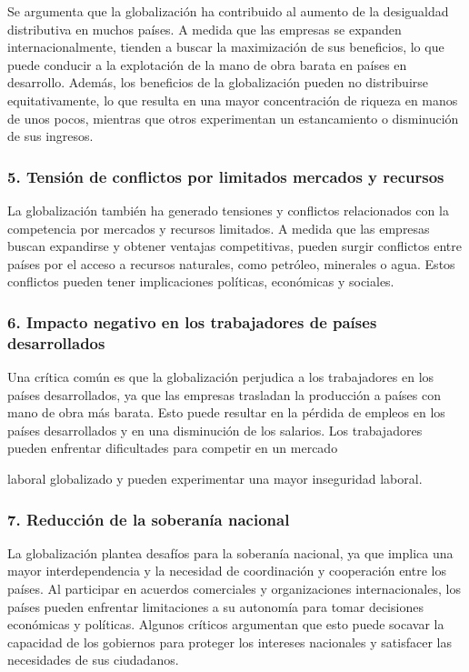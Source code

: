 \documentclass[
  a4paper,
]{article}
\begin{document}
Se argumenta que la globalización ha contribuido al aumento de la
desigualdad distributiva en muchos países. A medida que las empresas se
expanden internacionalmente, tienden a buscar la maximización de sus
beneficios, lo que puede conducir a la explotación de la mano de obra
barata en países en desarrollo. Además, los beneficios de la
globalización pueden no distribuirse equitativamente, lo que resulta en
una mayor concentración de riqueza en manos de unos pocos, mientras que
otros experimentan un estancamiento o disminución de sus ingresos.

\subsubsection{5. Tensión de conflictos por limitados mercados y
recursos}\label{tensiuxf3n-de-conflictos-por-limitados-mercados-y-recursos}

La globalización también ha generado tensiones y conflictos relacionados
con la competencia por mercados y recursos limitados. A medida que las
empresas buscan expandirse y obtener ventajas competitivas, pueden
surgir conflictos entre países por el acceso a recursos naturales, como
petróleo, minerales o agua. Estos conflictos pueden tener implicaciones
políticas, económicas y sociales.

\subsubsection{6. Impacto negativo en los trabajadores de países
desarrollados}\label{impacto-negativo-en-los-trabajadores-de-pauxedses-desarrollados}

Una crítica común es que la globalización perjudica a los trabajadores
en los países desarrollados, ya que las empresas trasladan la producción
a países con mano de obra más barata. Esto puede resultar en la pérdida
de empleos en los países desarrollados y en una disminución de los
salarios. Los trabajadores pueden enfrentar dificultades para competir
en un mercado

laboral globalizado y pueden experimentar una mayor inseguridad laboral.

\subsubsection{7. Reducción de la soberanía
nacional}\label{reducciuxf3n-de-la-soberanuxeda-nacional}

La globalización plantea desafíos para la soberanía nacional, ya que
implica una mayor interdependencia y la necesidad de coordinación y
cooperación entre los países. Al participar en acuerdos comerciales y
organizaciones internacionales, los países pueden enfrentar limitaciones
a su autonomía para tomar decisiones económicas y políticas. Algunos
críticos argumentan que esto puede socavar la capacidad de los gobiernos
para proteger los intereses nacionales y satisfacer las necesidades de
sus ciudadanos.
\end{document}
